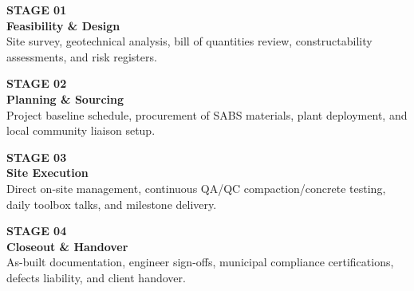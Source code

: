 \documentclass[a4paper,11pt]{article}
\begin{document}
\noindent
\begin{minipage}[t]{0.235\textwidth}
    \begin{tcolorbox}[
        enhanced, colback=mhnavy, colframe=mhnavy, boxrule=0pt, arc=3pt,
        coltext=white, left=6pt, right=6pt, top=8pt, bottom=8pt, height=3.6cm
    ]
        {\small\bfseries\color{mhbluelight} STAGE 01}\\
        {\footnotesize\bfseries Feasibility \& Design}\\[0.15cm]
        \fontsize{7.5pt}{10.5pt}\selectfont
        Site survey, geotechnical analysis, bill of quantities review, constructability assessments, and risk registers.
    \end{tcolorbox}
\end{minipage}
\hfill
\begin{minipage}[t]{0.235\textwidth}
    \begin{tcolorbox}[
        enhanced, colback=mhnavy2, colframe=mhnavy2, boxrule=0pt, arc=3pt,
        coltext=white, left=6pt, right=6pt, top=8pt, bottom=8pt, height=3.6cm
    ]
        {\small\bfseries\color{mhbluelight} STAGE 02}\\
        {\footnotesize\bfseries Planning \& Sourcing}\\[0.15cm]
        \fontsize{7.5pt}{10.5pt}\selectfont
        Project baseline schedule, procurement of SABS materials, plant deployment, and local community liaison setup.
    \end{tcolorbox}
\end{minipage}
\hfill
\begin{minipage}[t]{0.235\textwidth}
    \begin{tcolorbox}[
        enhanced, colback=mhnavy3, colframe=mhnavy3, boxrule=0pt, arc=3pt,
        coltext=white, left=6pt, right=6pt, top=8pt, bottom=8pt, height=3.6cm
    ]
        {\small\bfseries\color{white} STAGE 03}\\
        {\footnotesize\bfseries Site Execution}\\[0.15cm]
        \fontsize{7.5pt}{10.5pt}\selectfont
        Direct on-site management, continuous QA/QC compaction/concrete testing, daily toolbox talks, and milestone delivery.
    \end{tcolorbox}
\end{minipage}
\hfill
\begin{minipage}[t]{0.235\textwidth}
    \begin{tcolorbox}[
        enhanced, colback=mhnavy, colframe=mhnavy, boxrule=0pt, arc=3pt,
        coltext=white, left=6pt, right=6pt, top=8pt, bottom=8pt, height=3.6cm
    ]
        {\small\bfseries\color{mhbluelight} STAGE 04}\\
        {\footnotesize\bfseries Closeout \& Handover}\\[0.15cm]
        \fontsize{7.5pt}{10.5pt}\selectfont
        As-built documentation, engineer sign-offs, municipal compliance certifications, defects liability, and client handover.
    \end{tcolorbox}
\end{minipage}
\end{document}
